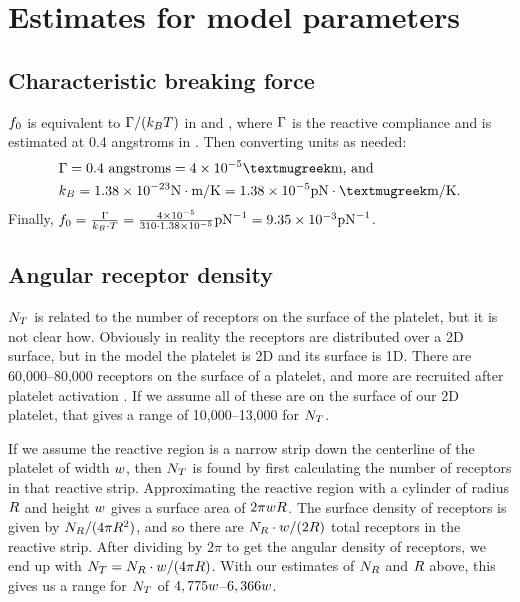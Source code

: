 \documentclass{article}
\newcommand{\inv}{^{-1}}
\begin{document}
\section{Estimates for model parameters}
\label{sec:estim-model-param}

\subsection{Characteristic breaking force}
\label{sec:char-break-force}

$f_0$ is equivalent to $\Gamma/(k_BT)$ in
\cite{Pospieszalska2009} and \cite{Sundd2011}, where $\Gamma$ is
the reactive compliance and is estimated at 0.4 angstroms in
\cite{Bhatia2003}. Then converting units as needed:
\begin{align*}
  &\compliance = 0.4 \text{ angstroms} = 4 \times 10^{-5}
    \text{{\textmugreek}m} \text{, and} \\
  &\boltzmann = 1.38 \times 10^{-23} \text{N}\cdot\text{m}/\text{K} =
    1.38 \times 10^{-5} \text{pN}\cdot\text{{\textmugreek}m}/\text{K}.
\end{align*}
Finally, $\refForce = \frac{\compliance}{\boltzmann\cdot\temp} =
\frac{4 \times 10^{-5}}{310 \cdot 1.38 \times 10^{-5}} \text{pN}\inv =
9.35 \times 10^{-3} \text{pN}\inv$.

\subsection{Angular receptor density}
\label{sec:ang-rec-dens}

$N_T$ is related to the number of receptors on the
surface of the platelet, but it is not clear how. Obviously in reality
the receptors are distributed over a 2D surface, but in the model the
platelet is 2D and its surface is 1D. There are 60,000--80,000 
  receptors on the surface of a platelet, and more are
recruited after platelet activation
\cite{Shattil1998,Litvinov2011}. If we assume all of these are on the
surface of our 2D platelet, that gives a range of 10,000--13,000 for
$N_T$. 

If we assume the reactive region is a narrow strip down the centerline
of the platelet of width $w$, then $N_T$ is found by
first calculating the number of receptors in that reactive
strip. Approximating the reactive region with a cylinder of radius
$R$ and height $w$ gives a surface area of
$2\pi wR$. The surface density of receptors is given by
$N_R/(4\pi R^2)$, and so there are
$N_R\cdot w/(2R)$ total receptors in the
reactive strip. After dividing by $2\pi$ to get the angular density of
receptors, we end up with $N_T =
N_R\cdot w/(4\pi R)$. With our estimates of
$N_R$ and $R$ above, this gives us a range for
$N_T$ of $4,775w$--$6,366w$.
\end{document}
